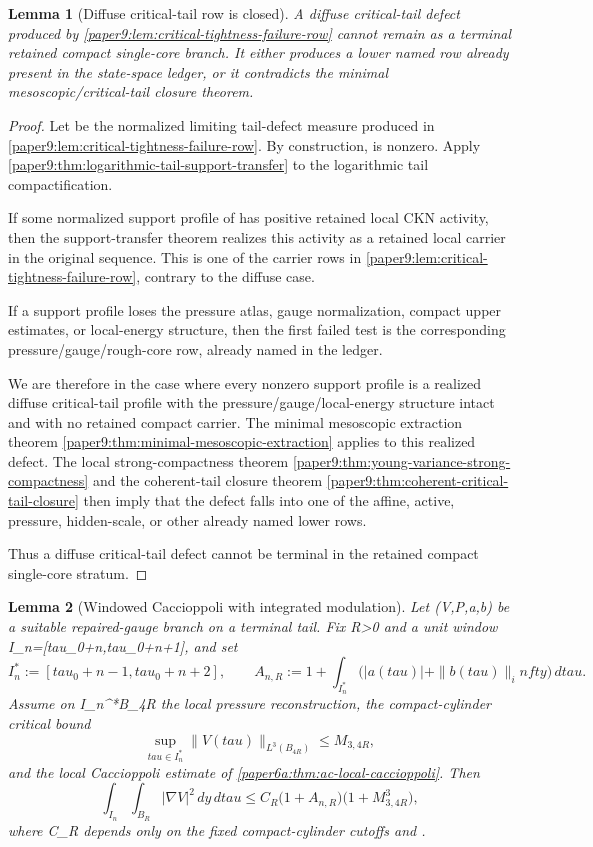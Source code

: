 \documentclass[11pt]{amsart}
\def\({}%
\def\){}%
\def\tau{tau}%
\def\infty{infty}%
\theoremstyle{plain}
\newtheorem{lemma}[lemma]{Lemma}
\theoremstyle{definition}
\theoremstyle{remark}
\begin{document}
\begin{lemma}[Diffuse critical-tail row is closed]
\label{paper9:lem:diffuse-critical-tail-row-closed}
A diffuse critical-tail defect produced by
\cref{paper9:lem:critical-tightness-failure-row} cannot remain as a terminal
retained compact single-core branch.  It either produces a lower named row
already present in the state-space ledger, or it contradicts the minimal
mesoscopic/critical-tail closure theorem.
\end{lemma}

\begin{proof}
Let \(\nu\) be the normalized limiting tail-defect measure produced in
\cref{paper9:lem:critical-tightness-failure-row}.  By construction, \(\nu\) is
nonzero.  Apply
\cref{paper9:thm:logarithmic-tail-support-transfer} to the logarithmic tail
compactification.

If some normalized support profile of \(\nu\) has positive retained local CKN
activity, then the support-transfer theorem realizes this activity as a
retained local carrier in the original sequence.  This is one of the carrier
rows in
\cref{paper9:lem:critical-tightness-failure-row}, contrary to the diffuse case.

If a support profile loses the pressure atlas, gauge normalization, compact
upper estimates, or local-energy structure, then the first failed test is the
corresponding pressure/gauge/rough-core row, already named in the ledger.

We are therefore in the case where every nonzero support profile is a realized
diffuse critical-tail profile with the pressure/gauge/local-energy structure
intact and with no retained compact carrier.  The minimal mesoscopic
extraction theorem
\cref{paper9:thm:minimal-mesoscopic-extraction} applies to this realized
defect.  The local strong-compactness theorem
\cref{paper9:thm:young-variance-strong-compactness} and the coherent-tail
closure theorem \cref{paper9:thm:coherent-critical-tail-closure} then imply
that the defect falls into one of the affine, active, pressure, hidden-scale,
or other already named lower rows.

Thus a diffuse critical-tail defect cannot be terminal in the retained compact
single-core stratum.
\end{proof}

\begin{lemma}[Windowed Caccioppoli with integrated modulation]
\label{paper6a:lem:windowed-h1-from-integrated-modulation}
Let \((V,P,a,b)\) be a suitable repaired-gauge branch on a terminal tail.
Fix \(R>0\) and a unit window \(I_n=[\tau_0+n,\tau_0+n+1]\), and set
\[
  I_n^*:=[\tau_0+n-1,\tau_0+n+2],
  \qquad
  A_{n,R}:=1+\int_{I_n^*}\bigl(|a(\tau)|+\|b(\tau)\|_\infty\bigr)\,d\tau .
\]
Assume on \(I_n^*\times B_{4R}\) the local pressure reconstruction, the
compact-cylinder critical bound
\[
  \sup_{\tau\in I_n^*}\|V(\tau)\|_{L^3(B_{4R})}\le M_{3,4R},
\]
and the local Caccioppoli estimate of
\cref{paper6a:thm:ac-local-caccioppoli}.  Then
\[
  \int_{I_n}\int_{B_R}|\nabla V|^2\,dy\,d\tau
  \le
  C_R\bigl(1+A_{n,R}\bigr)
  \bigl(1+M_{3,4R}^3\bigr),
\]
where \(C_R\) depends only on the fixed compact-cylinder cutoffs and \(\nu\).
\end{lemma}
\end{document}
